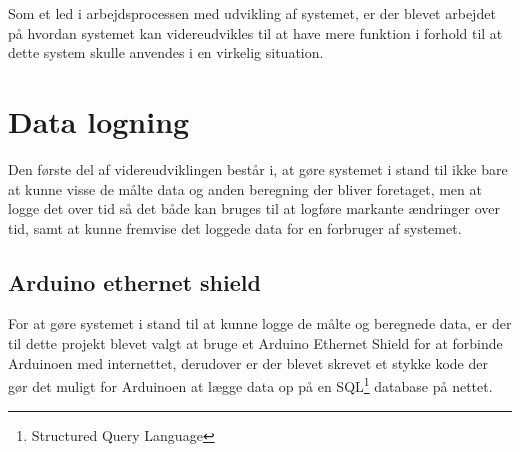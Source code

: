 Som et led i arbejdsprocessen med udvikling af systemet, er der blevet arbejdet på hvordan systemet kan videreudvikles til at have mere funktion i forhold til at dette system skulle anvendes i en virkelig situation.

\section{Data logning}
Den første del af videreudviklingen består i, at gøre systemet i stand til ikke bare at kunne visse de målte data og anden beregning der bliver foretaget, men at logge det over tid så det både kan bruges til at logføre markante ændringer over tid, samt at kunne fremvise det loggede data for en forbruger af systemet.

\subsection{Arduino ethernet shield}
For at gøre systemet i stand til at kunne logge de målte og beregnede data, er der til dette projekt blevet valgt at bruge et Arduino Ethernet Shield for at forbinde Arduinoen med internettet, derudover er der blevet skrevet et stykke kode der gør det muligt for Arduinoen at lægge data op på en SQL\footnote{Structured Query Language} database på nettet.
\newline

